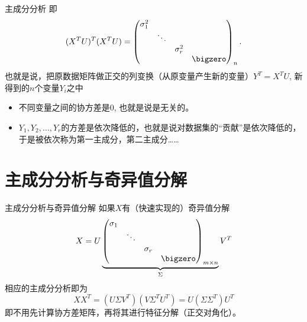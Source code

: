 
\begin{frame}

\begin{block}{主成分分析}
即
$$(X^TU)^T (X^TU) = \begin{pmatrix} \sigma_1^2 & & & \\ & \ddots & & \\ & & \sigma_r^2 & \\ & & & \bigzero \end{pmatrix}_n.$$
也就是说，把原数据矩阵做正交的列变换（从原变量产生新的变量）$Y^T = X^TU$, 新得到的$n$个变量$Y_i$之中
\begin{itemize}
\item 不同变量之间的协方差是$0$, 也就是说是无关的。
\item $Y_1,Y_2,\ldots,Y_r$的方差是依次降低的，也就是说对数据集的``贡献''是依次降低的，于是被依次称为第一主成分，第二主成分……
\end{itemize}
\end{block}

\end{frame}


\section{主成分分析与奇异值分解}


\begin{frame}

\begin{block}{主成分分析与奇异值分解}
如果$X$有（快速实现的）奇异值分解
$$X = U \underbrace{\begin{pmatrix} \sigma_1 & & & \\ & \ddots & & \\ & & \sigma_r & \\ & & & \bigzero \end{pmatrix}_{m\times n}}_{\Sigma} V^T$$
相应的主成分分析即为
$$XX^T = (U\Sigma V^T) (V\Sigma^T U^T) = U (\Sigma\Sigma^T) U^T$$
即不用先计算协方差矩阵，再将其进行特征分解（正交对角化）。
\end{block}

\end{frame}


